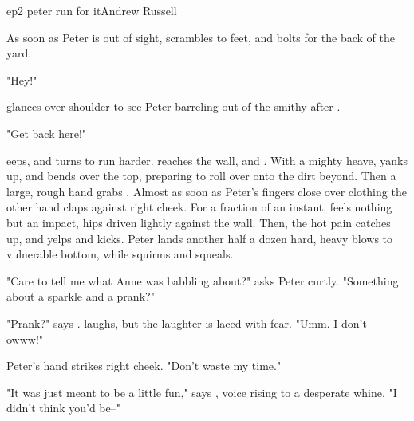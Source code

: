 \documentclass{book}
\begin{document}
\begin{childnode}{ep2 peter run for it}{Andrew Russell}


    As soon as Peter is out of sight, \name{} scrambles to \hisher{} feet, and bolts for the back of the yard. 

    "Hey!"

    \name{} glances over \hisher{} shoulder to see Peter barreling out of the smithy after \himher{}. 

    "Get back here!"

    \name{} eeps, and turns to run harder. \HeShe{} reaches the wall, and . With a mighty heave, \name{} yanks \himselfherself{} up, and bends over the top, preparing to roll over onto the dirt beyond.
    Then a large, rough hand grabs  
    \names{} \trousers{}. Almost as soon as Peter's fingers close over \names{} clothing the other hand claps against \hisher{} right cheek. For a fraction of an instant, \name{} feels nothing but an impact, \hisher{} hips driven lightly against the wall. Then, the hot pain catches up, and \name{} yelps and kicks. Peter lands another half a dozen hard, heavy blows to \names{} vulnerable bottom, while \name{} squirms and squeals. 

    "Care to tell me what Anne was babbling about?" asks Peter curtly. "Something about a sparkle and a prank?"

    "Prank?" says \name{}. \HeShe{} laughs, but the laughter is laced with fear. "Umm. I don't--owww!"

    Peter's hand strikes \names{} right cheek. "Don't waste my time."

    "It was just meant to be a little fun," says \name{}, \hisher{} voice rising to a desperate whine. "I didn't think you'd be--"


\end{childnode}
\end{document}
